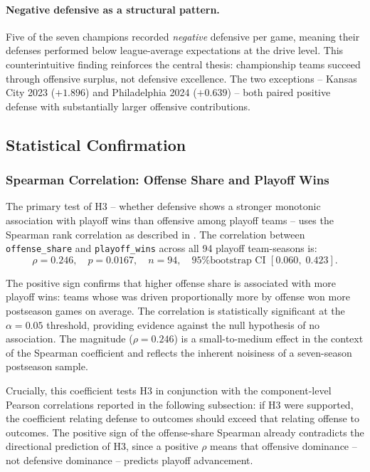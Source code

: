 \paragraph{Negative defensive \xvoa{} as a structural pattern.}
Five of the seven champions recorded \emph{negative} defensive \xvoa{} per game,
meaning their defenses performed below league-average expectations at the drive
level. This counterintuitive finding reinforces the central thesis: championship
teams succeed through offensive surplus, not defensive excellence. The two
exceptions -- Kansas City 2023 ($+1.896$) and Philadelphia 2024
($+0.639$) -- both paired positive defense with substantially larger offensive
contributions.

\subsection{Statistical Confirmation}
\label{sec:statistical-confirmation}

\subsubsection{Spearman Correlation: Offense Share and Playoff Wins}
\label{sec:spearman-results}

The primary test of H3 -- whether defensive \xvoa{} shows a stronger monotonic
association with playoff wins than offensive \xvoa{} among playoff teams -- uses
the Spearman rank correlation as described in . The
correlation between \texttt{offense\_share} and \texttt{playoff\_wins} across
all 94 playoff team-seasons is:
\[
  \rho = 0.246, \quad p = 0.0167, \quad n = 94, \quad \text{95\% bootstrap CI } [0.060,\; 0.423].
\]

The positive sign confirms that higher offense share is associated with more
playoff wins: teams whose \gds{} was driven proportionally more by offense won
more postseason games on average. The correlation is statistically significant
at the $\alpha = 0.05$ threshold, providing evidence against the null
hypothesis of no association. The magnitude ($\rho = 0.246$) is a small-to-medium
effect in the context of the Spearman coefficient and reflects the inherent
noisiness of a seven-season postseason sample.

Crucially, this coefficient tests H3 in conjunction with the component-level
Pearson correlations reported in the following subsection: if H3 were supported,
the coefficient relating defense to outcomes should exceed that relating offense
to outcomes. The positive sign of the offense-share Spearman already contradicts
the directional prediction of H3, since a positive $\rho$ means that offensive
dominance -- not defensive dominance -- predicts playoff advancement.

